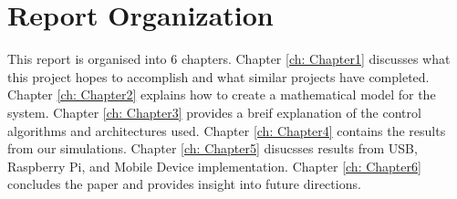 \section{Report Organization}
This report is organised into 6 chapters.  Chapter \ref{ch: Chapter1} discusses what this project hopes to accomplish and what similar projects have completed.  Chapter \ref{ch: Chapter2} explains how to create a mathematical model for the system.  Chapter \ref{ch: Chapter3} provides a breif explanation of the control algorithms and architectures used.  Chapter \ref{ch: Chapter4} contains the results from our simulations.  Chapter \ref{ch: Chapter5} disucsses results from USB, Raspberry Pi, and Mobile Device implementation.  Chapter \ref{ch: Chapter6} concludes the paper and provides insight into future directions.

